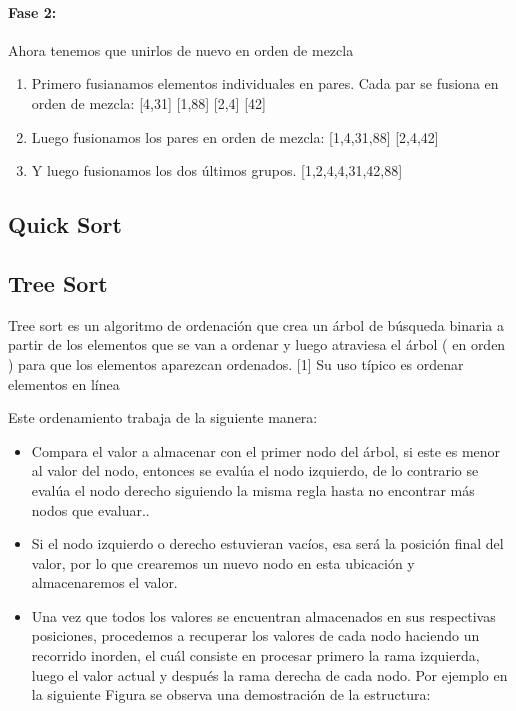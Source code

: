 \documentclass{article}
\begin{document}
    \paragraph{Fase 2:} Ahora tenemos que unirlos de nuevo en orden de mezcla
\begin{enumerate}
    \item Primero fusianamos elementos individuales en pares. Cada par se fusiona en orden de mezcla: [4,31] [1,88] [2,4] [42]
    \item Luego fusionamos los pares en orden de mezcla: [1,4,31,88] [2,4,42]
    \item Y luego fusionamos los dos últimos grupos. [1,2,4,4,31,42,88]
\end{enumerate}    

    \subsection{Quick Sort}
    
    
    \subsection{Tree Sort}
    
     Tree sort es un algoritmo de ordenación que crea un árbol de búsqueda binaria a partir de los elementos que se van a ordenar y luego atraviesa el árbol ( en orden ) para que los elementos aparezcan ordenados. [1] Su uso típico es ordenar elementos en línea 
     
     Este ordenamiento trabaja de la siguiente manera:
     \begin{itemize}
            \item Compara el valor a almacenar con el primer nodo del árbol, si este es menor al valor del nodo, entonces se evalúa el nodo izquierdo, de lo contrario se evalúa el nodo derecho siguiendo la misma regla hasta no encontrar más nodos que evaluar..

            \item Si el nodo izquierdo o derecho estuvieran vacíos, esa será la posición final del valor, por lo que crearemos un nuevo nodo en esta ubicación y almacenaremos el valor.
            
            \item Una vez que todos los valores se encuentran almacenados en sus respectivas posiciones, procedemos a recuperar los valores de cada nodo haciendo un recorrido inorden, el cuál consiste en procesar primero la rama izquierda, luego el valor actual y después la rama derecha de cada nodo.
    Por ejemplo en la siguiente Figura se observa una demostración de la estructura:
        
        \end{itemize}
        
\end{document}

